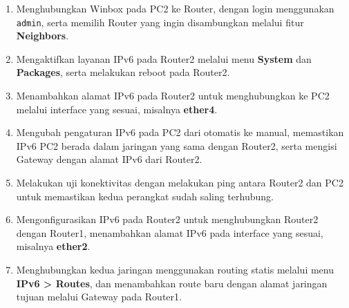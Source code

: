 \begin{enumerate}
    \item Menghubungkan Winbox pada PC2 ke Router, dengan login menggunakan \texttt{admin}, serta memilih Router yang ingin disambungkan melalui fitur \textbf{Neighbors}.
    \item Mengaktifkan layanan IPv6 pada Router2 melalui menu \textbf{System} dan \textbf{Packages}, serta melakukan reboot pada Router2.
    \item Menambahkan alamat IPv6 pada Router2 untuk menghubungkan ke PC2 melalui interface yang sesuai, misalnya \textbf{ether4}.
    \item Mengubah pengaturan IPv6 pada PC2 dari otomatis ke manual, memastikan IPv6 PC2 berada dalam jaringan yang sama dengan Router2, serta mengisi Gateway dengan alamat IPv6 dari Router2.
    \item Melakukan uji konektivitas dengan melakukan ping antara Router2 dan PC2 untuk memastikan kedua perangkat sudah saling terhubung.
    \item Mengonfigurasikan IPv6 pada Router2 untuk menghubungkan Router2 dengan Router1, menambahkan alamat IPv6 pada interface yang sesuai, misalnya \textbf{ether2}.
    \item Menghubungkan kedua jaringan menggunakan routing statis melalui menu \textbf{IPv6 > Routes}, dan menambahkan route baru dengan alamat jaringan tujuan melalui Gateway pada Router1.
\end{enumerate}